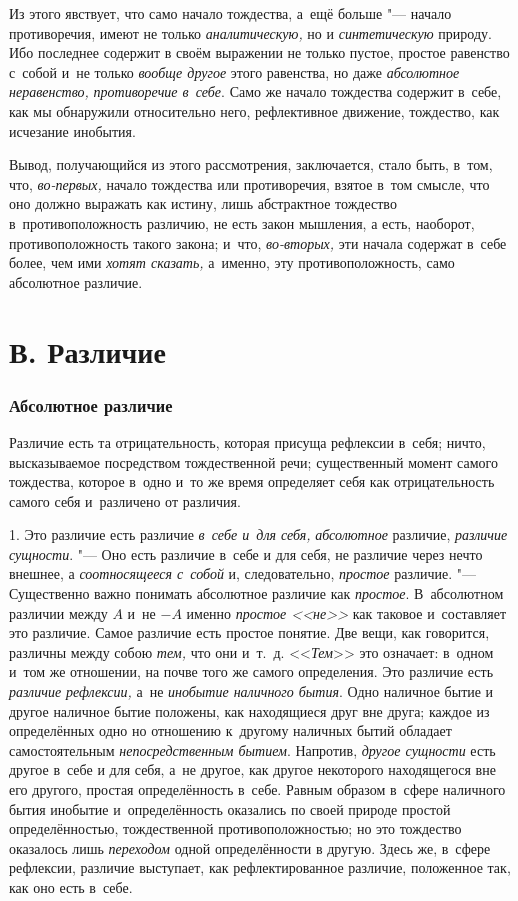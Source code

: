 Из этого явствует, что само начало тождества, а~ещё больше "--- начало
противоречия, имеют не только {\em аналитическую,} но и
{\em синтетическую} природу. Ибо последнее содержит в
своём выражении не только пустое, простое равенство с~собой и~не только
{\em вообще другое} этого равенства, но даже
{\em абсолютное неравенство,}
{\em противоречие в~себе}. Само же начало тождества
содержит в~себе, как мы обнаружили относительно него, рефлективное
движение, тождество, как исчезание инобытия.

Вывод, получающийся из этого рассмотрения, заключается, стало быть, в~том,
что, {\em во-первых,} начало тождества или
противоречия, взятое в~том смысле, что оно должно выражать как истину, лишь
абстрактное тождество в~противоположность различию, не есть закон мышления,
а есть, наоборот, противоположность такого закона; и~что,
{\em во-вторых,} эти начала содержат в~себе более, чем
ими {\em хотят сказать,} а~именно, эту
противоположность, само абсолютное различие.

\section[В. Различие]{В. Различие}
\subsubsection{Абсолютное различие}
Различие есть та отрицательность, которая
присуща рефлексии в~себя; ничто, высказываемое посредством тождественной
речи; существенный момент самого тождества, которое в~одно и~то же время
определяет себя как отрицательность самого себя и~различено от различия.

1. Это различие есть различие {\em в~себе и~для себя,}
{\em абсолютное} различие,
{\em различие сущности}. "--- Оно есть различие в~себе и
для себя, не различие через нечто внешнее, а
{\em соотносящееся с~собой} и, следовательно,
{\em простое} различие. "--- Существенно важно понимать
абсолютное различие как {\em простое}. В~абсолютном
различии между $A$ и~не $-A$ именно
{\em простое <<не>>} как таковое и~составляет это
различие. Самое различие есть простое понятие. Две вещи, как говорится,
различны между собою {\em тем,} что они и~т.~д.
<<{\em Тем}>> это означает: в~одном и~том же отношении,
на почве того же самого определения. Это различие есть
{\em различие рефлексии,} а~не
{\em инобытие наличного бытия}. Одно наличное бытие и
другое наличное бытие положены, как находящиеся друг вне друга; каждое из
определённых одно но отношению к~другому наличных бытий обладает
самостоятельным {\em непосредственным бытием}.
Напротив, {\em другое сущности} есть другое в~себе и
для себя, а~не другое, как другое некоторого находящегося вне его другого,
простая определённость в~себе. Равным образом в~сфере наличного бытия
инобытие и~определённость оказались по своей природе простой
определённостью, тождественной противоположностью; но это тождество
оказалось лишь {\em переходом} одной определённости в
другую. Здесь же, в~сфере рефлексии, различие выступает, как
рефлектированное различие, положенное так, как оно есть в~себе.

